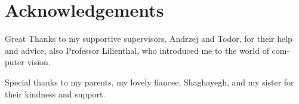 \cleardoublepage
{}
{}
\chapter*{Acknowledgements}

Great Thanks to my supportive supervisors, Andrzej and Todor, for their help
and advice, also Professor Lilienthal, who introduced me to the world of com-
puter vision.

Special thanks to my parents, my lovely fiancee, Shaghayegh, and my sister
for their kindness and support.


% 
